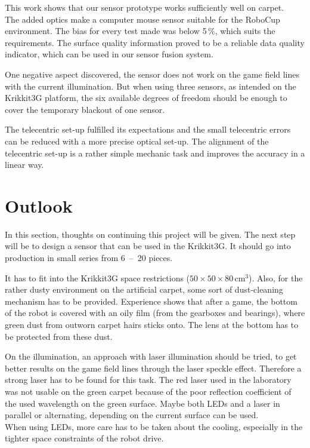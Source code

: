 \documentclass[12pt,a4paper]{article}
\begin{document}
This work shows that our sensor prototype works sufficiently well on carpet.\\
The added optics make a computer mouse sensor suitable for the RoboCup environment.
The bias for every test made was below 5\,\%, which suits the requirements.
The surface quality information proved to be a reliable data quality indicator, which can be used in our sensor fusion system.

One negative aspect discovered, the sensor does not work on the game field lines with the current illumination.
But when using three sensors, as intended on the Krikkit3G platform, the six available degrees of freedom should be enough to cover the temporary blackout of one sensor.

The telecentric set-up fulfilled its expectations and the small telecentric errors can be reduced with a more precise optical set-up.
The alignment of the telecentric set-up is a rather simple mechanic task and improves the accuracy in a linear way.

\clearpage
\section{Outlook}

In this section, thoughts on continuing this project will be given.
The next step will be to design a sensor that can be used in the Krikkit3G.
It should go into production in small series from 6~--~20 pieces.

It has to fit into the Krikkit3G space restrictions ($50\times50\times80$\,cm$^3$).
Also, for the rather dusty environment on the artificial carpet, some sort of dust-cleaning mechanism has to be provided.
Experience shows that after a game, the bottom of the robot is covered with an oily film (from the gearboxes and bearings), where green dust from outworn carpet hairs sticks onto.
The lens at the bottom has to be protected from these dust.

On the illumination, an approach with laser illumination should be tried, to get better results on the game field lines through the laser speckle effect.
Therefore a strong laser has to be found for this task.
The red laser used in the laboratory was not usable on the green carpet because of the poor reflection coefficient of the used wavelength on  the green surface.
Maybe both LEDs and a laser in parallel or alternating, depending on the current surface can be used.\\
When using LEDs, more care has to be taken about the cooling, especially in the tighter space constraints of the robot drive.
\end{document}
